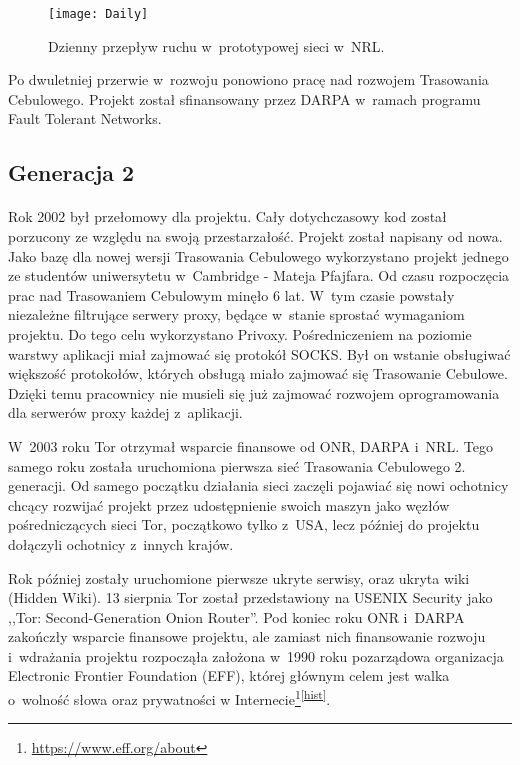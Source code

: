 \begin{figure}
  \centering
  \texttt{[image: Daily]} 
  \caption[Caption for LOF]{Dzienny przepływ ruchu w~prototypowej sieci w~NRL\footnotemark.}
  \label{rys:dzienny}
\end{figure}

Po dwuletniej przerwie w~rozwoju ponowiono pracę nad rozwojem Trasowania Cebulowego. Projekt został sfinansowany przez DARPA w~ramach programu Fault Tolerant Networks.

\subsection{Generacja 2}\paragraph{}
Rok 2002 był przełomowy dla projektu. Cały dotychczasowy kod został porzucony ze względu na swoją przestarzałość. Projekt został napisany od nowa. Jako bazę dla nowej wersji Trasowania Cebulowego wykorzystano projekt jednego ze studentów uniwersytetu w~Cambridge - Mateja Pfajfara. Od czasu rozpoczęcia prac nad Trasowaniem Cebulowym minęło 6 lat. W~tym czasie powstały niezależne filtrujące serwery proxy, będące w~stanie sprostać wymaganiom projektu. Do tego celu wykorzystano Privoxy. Pośredniczeniem na poziomie warstwy aplikacji miał zajmować się protokół SOCKS. Był on wstanie obsługiwać większość protokołów, których obsługą miało zajmować się Trasowanie Cebulowe. Dzięki temu pracownicy nie musieli się już zajmować rozwojem oprogramowania dla serwerów proxy każdej z~aplikacji. 

W~2003 roku Tor otrzymał wsparcie finansowe od ONR, DARPA i~NRL. Tego samego roku została uruchomiona pierwsza sieć Trasowania Cebulowego 2. generacji. Od samego początku działania sieci zaczęli pojawiać się nowi ochotnicy chcący rozwijać projekt przez udostępnienie swoich maszyn jako węzłów pośredniczących sieci Tor, początkowo tylko z~USA, lecz później do projektu dołączyli ochotnicy z~innych krajów. 

Rok później zostały uruchomione pierwsze ukryte serwisy, oraz ukryta wiki (Hidden Wiki). 13 sierpnia Tor został przedstawiony na USENIX Security jako ,,Tor: Second-Generation Onion Router''. Pod koniec roku ONR i~DARPA zakończły wsparcie finansowe projektu, ale zamiast nich finansowanie rozwoju i~wdrażania projektu rozpocząła założona w~1990 roku pozarządowa organizacja Electronic Frontier Foundation (EFF), której głównym celem jest walka o~wolność słowa oraz prywatności w Internecie\footnote{\url{https://www.eff.org/about}}\textsuperscript{\ref{hist}}.

